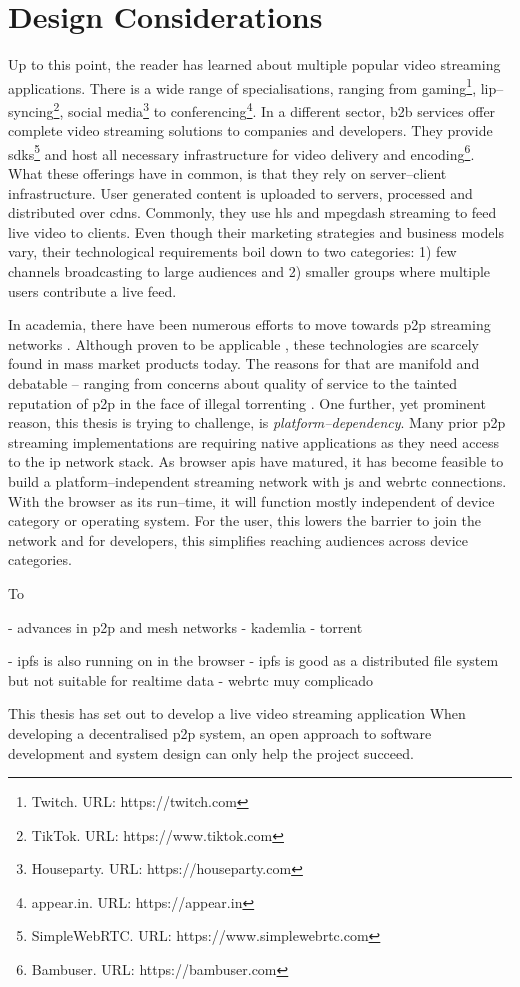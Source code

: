 \section{Design Considerations}

Up to this point, the reader has learned about multiple popular video streaming applications. There is a wide range of specialisations, ranging from gaming\footnote{Twitch. URL: {https://twitch.com}}, lip–syncing\footnote{TikTok. URL: {https://www.tiktok.com}}, social media\footnote{Houseparty. URL: {https://houseparty.com}} to conferencing\footnote{appear.in. URL: {https://appear.in}}. In a different sector, \gls{b2b} services offer complete video streaming solutions to companies and developers. They provide \glspl{sdk}\footnote{SimpleWebRTC. URL: {https://www.simplewebrtc.com}} and host all necessary infrastructure for video delivery and encoding\footnote{Bambuser. URL: {https://bambuser.com}}. What these offerings have in common, is that they rely on server–client infrastructure. User generated content is uploaded to servers, processed and distributed over \glspl{cdn}. Commonly, they use \gls{hls} and \gls{mpegdash} streaming to feed live video to clients. Even though their marketing strategies and business models vary, their technological requirements boil down to two categories: 1) few channels broadcasting to large audiences and 2) smaller groups where multiple users contribute a live feed.

In academia, there have been numerous efforts to move towards \gls{p2p} streaming networks \cite{anysee, coolstreaming, hlpsp}. Although proven to be applicable \cite{skype-p2p-primer, tox-chat-app}, these technologies are scarcely found in mass market products today. The reasons for that are manifold and debatable – ranging from concerns about quality of service \cite{skype-ditching-p2p} to the tainted reputation of \gls{p2p} in the face of illegal torrenting \cite{p2p-social-impact}. One further, yet prominent reason, this thesis is trying to challenge, is \textit{platform–dependency}. Many prior \gls{p2p} streaming implementations are requiring native applications as they need access to the \gls{ip} network stack. As browser \glspl{api} have matured, it has become feasible to build a platform–independent streaming network with \gls{js} and \gls{webrtc} connections. With the browser as its run–time, it will function mostly independent of device category or operating system. For the user, this lowers the barrier to join the network and for developers, this simplifies reaching audiences across device categories.

To 

- advances in p2p and mesh networks
- kademlia
- torrent

- ipfs is also running on in the browser
- ipfs is good as a distributed file system but not suitable for realtime data
- webrtc muy complicado

This thesis has set out to develop a live video streaming application
When developing a decentralised \gls{p2p} system, an open approach to software development and system design can only help the project succeed.
